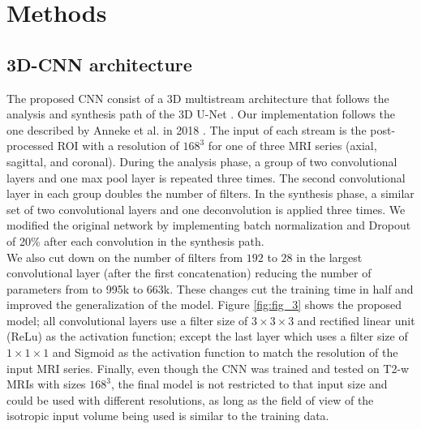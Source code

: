 \section{Methods}
\label{sec:methods}




\subsection{3D-CNN architecture}
The proposed CNN consist of a 3D multistream architecture that follows the analysis and synthesis path of the 3D U-Net \cite{cciccek20163d}. Our implementation follows the one described by Anneke et al. in 2018  \cite{anneke}. The input of each stream is the post-processed ROI with a resolution of $168^3$ for one of three MRI series (axial, sagittal, and coronal). During the analysis phase, a group of two convolutional layers and one max pool layer is repeated three times. The second convolutional layer in each group doubles the number of filters.  In the synthesis phase, a similar set of two convolutional layers and one deconvolution is applied three times. We modified the original network by implementing batch normalization \cite{ioffe2015batch} and Dropout of 20\%  \cite{hinton2012improving} after each convolution in the synthesis path.\\

We also cut down on the number of filters from $192$ to $28$ in the largest convolutional layer (after the first concatenation) reducing the number of parameters from to 995k to 663k. These changes cut the training time in half and improved the generalization of the  model. Figure \ref{fig:fig_3} shows the proposed model; all convolutional layers use a filter size of $3 \times 3 \times 3$ and rectified linear unit (ReLu) as the activation function; except the last layer which uses a filter size of $1 \times 1 \times 1$ and Sigmoid as the activation function to match the resolution of the input MRI series.
Finally, even though the CNN was trained and tested on T2-w MRIs with sizes $168^3$, the final model is not restricted to that input size and could be used with different resolutions, as long as the field of view of the isotropic input volume being used is similar to the training data. 

